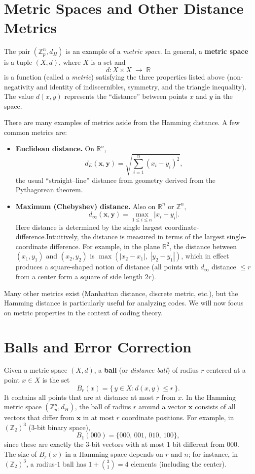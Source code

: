 \documentclass[docmute]{article}
\begin{document}
\section{Metric Spaces and Other Distance Metrics}

The pair \((\mathbb{Z}_p^n, d_H)\) is an example of a \emph{metric space}. In general, a \textbf{metric space} is a tuple \((X, d)\), where \(X\) is a set and
\[
  d: X \times X \;\longrightarrow\; \mathbb{R}
\]
is a function (called a \emph{metric}) satisfying the three properties listed above (non-negativity and identity of indiscernibles, symmetry, and the triangle inequality). The value \(d(x,y)\) represents the “distance” between points \(x\) and \(y\) in the space.

There are many examples of metrics aside from the Hamming distance. A few common metrics are:

\begin{itemize}
  \item \textbf{Euclidean distance.}  On \(\mathbb{R}^n\),
  \[
    d_E(\mathbf{x},\mathbf{y})
    = \sqrt{\sum_{i=1}^n (x_i - y_i)^2},
  \]
  the usual “straight–line” distance from geometry derived from the Pythagorean theorem.
  
  \item \textbf{Maximum (Chebyshev) distance.}  Also on \(\mathbb{R}^n\) or \(\mathbb{Z}^n\),
  \[
    d_\infty(\mathbf{x},\mathbf{y})
    = \max_{1\le i\le n}\bigl|x_i - y_i\bigr|.
  \]
  Here distance is determined by the single largest coordinate‐difference.Intuitively, the distance is measured in terms of the largest single-coordinate difference. For example, in the plane $\mathbb{R}^2$, the distance between $(x_1,y_1)$ and $(x_2,y_2)$ is $\max(|x_2-x_1|,\;|y_2-y_1|)$, which in effect produces a square-shaped notion of distance (all points with $d_\infty$ distance $\le r$ from a center form a square of side length $2r$).
\end{itemize}

\noindent Many other metrics exist (Manhattan distance, discrete metric, etc.), but the Hamming distance is particularly useful for analyzing codes. We will now focus on metric properties in the context of coding theory.


\section{Balls and Error Correction}

Given a metric space $(X,d)$, a \textbf{ball} (or \emph{distance ball}) of radius $r$ centered at a point $x \in X$ is the set 
\[ B_r(x) = \{\,y \in X : d(x,y) \le r\,\}. \] 
It contains all points that are at distance at most $r$ from $x$. In the Hamming metric space $(\mathbb{Z}_p^n, d_H)$, the ball of radius $r$ around a vector $\mathbf{x}$ consists of all vectors that differ from $\mathbf{x}$ in at most $r$ coordinate positions. For example, in $(\mathbb{Z}_2)^3$ (3-bit binary space), 
\[ B_1(000) = \{000,\,001,\,010,\,100\}, \] 
since these are exactly the 3-bit vectors with at most 1 bit different from $000$. The size of $B_r(x)$ in a Hamming space depends on $r$ and $n$; for instance, in $(\mathbb{Z}_2)^3$, a radius-$1$ ball has $1 + \binom{3}{1} = 4$ elements (including the center).
\end{document}
